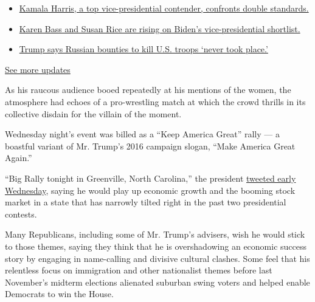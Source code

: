 \begin{itemize}
\tightlist
\item
  \href{https://www.nytimes.com/2020/07/31/us/elections/biden-vs-trump.html?action=click\&pgtype=Article\&state=default\&region=MAIN_CONTENT_1\&context=storylines_live_updates\#link-29fdff45}{Kamala
  Harris, a top vice-presidential contender, confronts double
  standards.}
\item
  \href{https://www.nytimes.com/2020/07/31/us/elections/biden-vs-trump.html?action=click\&pgtype=Article\&state=default\&region=MAIN_CONTENT_1\&context=storylines_live_updates\#link-13ec3d9c}{Karen
  Bass and Susan Rice are rising on Biden's vice-presidential
  shortlist.}
\item
  \href{https://www.nytimes.com/2020/07/31/us/elections/biden-vs-trump.html?action=click\&pgtype=Article\&state=default\&region=MAIN_CONTENT_1\&context=storylines_live_updates\#link-49e9a016}{Trump
  says Russian bounties to kill U.S. troops `never took place.'}
\end{itemize}

\href{https://www.nytimes.com/2020/07/31/us/elections/biden-vs-trump.html?action=click\&pgtype=Article\&state=default\&region=MAIN_CONTENT_1\&context=storylines_live_updates}{See
more updates}

As his raucous audience booed repeatedly at his mentions of the women,
the atmosphere had echoes of a pro-wrestling match at which the crowd
thrills in its collective disdain for the villain of the moment.

Wednesday night's event was billed as a ``Keep America Great'' rally ---
a boastful variant of Mr. Trump's 2016 campaign slogan, ``Make America
Great Again.''

``Big Rally tonight in Greenville, North Carolina,'' the president
\href{https://twitter.com/realDonaldTrump/status/1151473175496146945}{tweeted
early Wednesday}, saying he would play up economic growth and the
booming stock market in a state that has narrowly tilted right in the
past two presidential contests.

Many Republicans, including some of Mr. Trump's advisers, wish he would
stick to those themes, saying they think that he is overshadowing an
economic success story by engaging in name-calling and divisive cultural
clashes. Some feel that his relentless focus on immigration and other
nationalist themes before last November's midterm elections alienated
suburban swing voters and helped enable Democrats to win the House.

